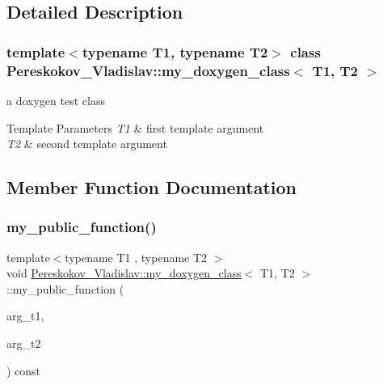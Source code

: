 \subsection{Detailed Description}
\subsubsection*{template$<$typename T1, typename T2$>$\newline
class Pereskokov\+\_\+\+Vladislav\+::my\+\_\+doxygen\+\_\+class$<$ T1, T2 $>$}

a doxygen test class 


\begin{DoxyTemplParams}{Template Parameters}
{\em T1} & first template argument \\
\hline
{\em T2} & second template argument \\
\hline
\end{DoxyTemplParams}


\subsection{Member Function Documentation}
\mbox{\label{classPereskokov__Vladislav_1_1my__doxygen__class_a90642e89277ce4bb3493e3cf2a6193c4}} 
\subsubsection{\texorpdfstring{my\+\_\+public\+\_\+function()}{my\_public\_function()}}
{\footnotesize\ttfamily template$<$typename T1 , typename T2 $>$ \\
void \hyperlink{classPereskokov__Vladislav_1_1my__doxygen__class}{Pereskokov\+\_\+\+Vladislav\+::my\+\_\+doxygen\+\_\+class}$<$ T1, T2 $>$\+::my\+\_\+public\+\_\+function (\begin{DoxyParamCaption}\item[{T1}]{arg\+\_\+t1,  }\item[{T2}]{arg\+\_\+t2 }\end{DoxyParamCaption}) const\hspace{0.3cm}{\ttfamily [inline]}}



